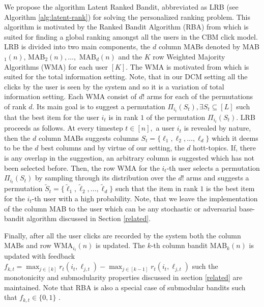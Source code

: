 We propose the algorithm Latent Ranked Bandit, abbreviated as LRB (see Algorithm \ref{alg:latent-rank}) for solving the personalized ranking problem. This algorithm is motivated by the Ranked Bandit Algorithm (RBA) from \citet{radlinski2008learning} which is suited for finding a global ranking amongst all the users  in the CBM click model. LRB is divided into two main components, the $d$ column MABs denoted by MAB$_1(n)$, MAB$_2(n), \dots,$ MAB$_d(n)$ and the $K$ row Weighted Majority Algorithms (WMA) for each user $[K]$. The WMA is motivated  from \citet{littlestone1994weighted} which is suited for the total information  setting. Note, that in our DCM setting all the clicks by the user is seen by the system and so it is a variation  of total information setting. Each WMA consist of $d!$ arms for each of the permutations of rank $d$. Its main  goal is to suggest a permutation $\Pi_{i_t}(S_t), \exists S_t \subseteq [L]$  such that the best item for the user $i_t$ is in rank $1$ of the permutation $\Pi_{i_t}(S_t)$.  LRB proceeds as follows. At every timestep $t\in[n],$ a user $i_t$ is revealed by nature, then the $d$ column MABs suggests columns $S_t = \lbrace {\ell}_{1}, {\ell}_{2},\dots, {\ell}_{d} \rbrace$ which it deems to be the $d$ best columns and by virtue of our setting, the $d$ hott-topics. If, there is any overlap in the suggestion, an arbitrary column is suggested which has not been selected before. Then, the row WMA for the $i_t$-th user selects a permutation $\Pi_{i_t}(S_t)$ by sampling through its distribution over the $d!$ arms and suggests a permutation $\tilde{S}_t = \lbrace \tilde{\ell}_{1}, \tilde{\ell}_{2},\dots, \tilde{\ell}_{d}\rbrace$ such that the item in rank $1$ is the best item for the $i_t$-th user with a high probability. Note, that we leave the implementation of the column MAB to the user which can be any stochastic or adversarial base-bandit algorithm discussed in Section \ref{related}. 

Finally, after all the user clicks are recorded by the system both the column MABs and row WMA$_{i_t}(n)$ is updated. The $k$-th column bandit MAB$_k(n)$ is updated with feedback $f_{k,t} = \max_{j\in [k]} r_t(i_t, \ell_{j,t}) - \max_{j\in [k-1]} r_t(i_t,\ell_{j,t})$ such the monotonicity and submodularity properties discussed in section \ref{related} are maintained. Note that RBA is also a special case of submodular bandits such that $f_{k,t}\in\lbrace 0, 1\rbrace$ \citep{streeter2009online}. 


